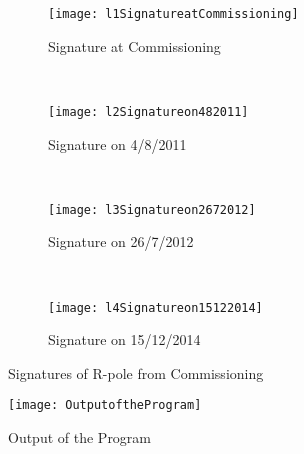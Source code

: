 \begin{figure}
    \centering
    \begin{subfigure}[b]{\textwidth}
        \centering
        \texttt{[image: l1SignatureatCommissioning]}
        \caption{Signature at Commissioning}
        \label{fig:Signature at Commissioning}
    \end{subfigure}
    \\
    \begin{subfigure}[b]{\textwidth}
        \centering
        \texttt{[image: l2Signatureon482011]}
        \caption{Signature on 4/8/2011}
        \label{fig:Signature on 4/8/2011}
    \end{subfigure}
    \\
    \begin{subfigure}[b]{\textwidth}
        \centering
        \texttt{[image: l3Signatureon2672012]}
        \caption{Signature on 26/7/2012}
        \label{fig:Signature on 26/7/2012}
    \end{subfigure}
    \\
    \begin{subfigure}[b]{\textwidth}
        \centering
        \texttt{[image: l4Signatureon15122014]}
        \caption{Signature on 15/12/2014}
        \label{fig:Signature on 15/12/2014}
    \end{subfigure}
    
    \caption{Signatures of R-pole from Commissioning}
    \label{fig:Signatures of R-pole from Commissioning}
\end{figure}

\begin{figure}[!htbp]
    \centering
    \texttt{[image: OutputoftheProgram]}
    \caption{Output of the Program}
    \label{fig:Output of the Program}
\end{figure}

